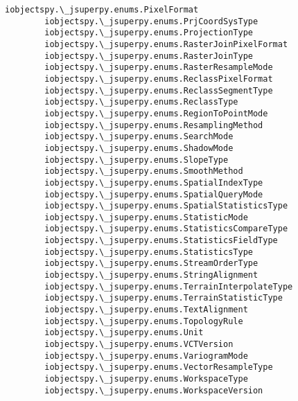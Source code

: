 \documentclass[11pt]{article}
\begin{document}
\begin{Verbatim}[commandchars=\\\{\}]
        iobjectspy.\_jsuperpy.enums.PixelFormat
        iobjectspy.\_jsuperpy.enums.PrjCoordSysType
        iobjectspy.\_jsuperpy.enums.ProjectionType
        iobjectspy.\_jsuperpy.enums.RasterJoinPixelFormat
        iobjectspy.\_jsuperpy.enums.RasterJoinType
        iobjectspy.\_jsuperpy.enums.RasterResampleMode
        iobjectspy.\_jsuperpy.enums.ReclassPixelFormat
        iobjectspy.\_jsuperpy.enums.ReclassSegmentType
        iobjectspy.\_jsuperpy.enums.ReclassType
        iobjectspy.\_jsuperpy.enums.RegionToPointMode
        iobjectspy.\_jsuperpy.enums.ResamplingMethod
        iobjectspy.\_jsuperpy.enums.SearchMode
        iobjectspy.\_jsuperpy.enums.ShadowMode
        iobjectspy.\_jsuperpy.enums.SlopeType
        iobjectspy.\_jsuperpy.enums.SmoothMethod
        iobjectspy.\_jsuperpy.enums.SpatialIndexType
        iobjectspy.\_jsuperpy.enums.SpatialQueryMode
        iobjectspy.\_jsuperpy.enums.SpatialStatisticsType
        iobjectspy.\_jsuperpy.enums.StatisticMode
        iobjectspy.\_jsuperpy.enums.StatisticsCompareType
        iobjectspy.\_jsuperpy.enums.StatisticsFieldType
        iobjectspy.\_jsuperpy.enums.StatisticsType
        iobjectspy.\_jsuperpy.enums.StreamOrderType
        iobjectspy.\_jsuperpy.enums.StringAlignment
        iobjectspy.\_jsuperpy.enums.TerrainInterpolateType
        iobjectspy.\_jsuperpy.enums.TerrainStatisticType
        iobjectspy.\_jsuperpy.enums.TextAlignment
        iobjectspy.\_jsuperpy.enums.TopologyRule
        iobjectspy.\_jsuperpy.enums.Unit
        iobjectspy.\_jsuperpy.enums.VCTVersion
        iobjectspy.\_jsuperpy.enums.VariogramMode
        iobjectspy.\_jsuperpy.enums.VectorResampleType
        iobjectspy.\_jsuperpy.enums.WorkspaceType
        iobjectspy.\_jsuperpy.enums.WorkspaceVersion
    

\end{Verbatim}
\end{document}
